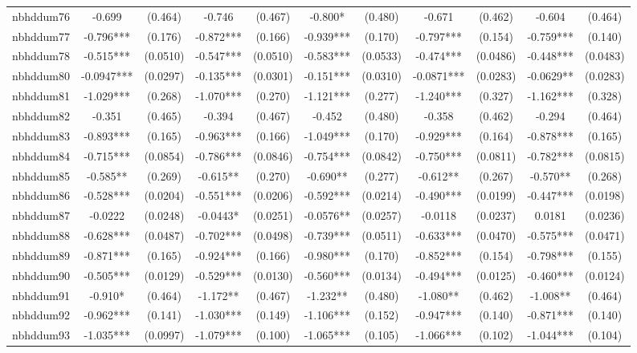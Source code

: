 \documentclass[]{article}
\begin{document}
\begin{tabular}{lcccccccccc}
nbhddum76 & -0.699 & (0.464) & -0.746 & (0.467) & -0.800* & (0.480) & -0.671 & (0.462) & -0.604 & (0.464) \\
nbhddum77 & -0.796*** & (0.176) & -0.872*** & (0.166) & -0.939*** & (0.170) & -0.797*** & (0.154) & -0.759*** & (0.140) \\
nbhddum78 & -0.515*** & (0.0510) & -0.547*** & (0.0510) & -0.583*** & (0.0533) & -0.474*** & (0.0486) & -0.448*** & (0.0483) \\
nbhddum80 & -0.0947*** & (0.0297) & -0.135*** & (0.0301) & -0.151*** & (0.0310) & -0.0871*** & (0.0283) & -0.0629** & (0.0283) \\
nbhddum81 & -1.029*** & (0.268) & -1.070*** & (0.270) & -1.121*** & (0.277) & -1.240*** & (0.327) & -1.162*** & (0.328) \\
nbhddum82 & -0.351 & (0.465) & -0.394 & (0.467) & -0.452 & (0.480) & -0.358 & (0.462) & -0.294 & (0.464) \\
nbhddum83 & -0.893*** & (0.165) & -0.963*** & (0.166) & -1.049*** & (0.170) & -0.929*** & (0.164) & -0.878*** & (0.165) \\
nbhddum84 & -0.715*** & (0.0854) & -0.786*** & (0.0846) & -0.754*** & (0.0842) & -0.750*** & (0.0811) & -0.782*** & (0.0815) \\
nbhddum85 & -0.585** & (0.269) & -0.615** & (0.270) & -0.690** & (0.277) & -0.612** & (0.267) & -0.570** & (0.268) \\
nbhddum86 & -0.528*** & (0.0204) & -0.551*** & (0.0206) & -0.592*** & (0.0214) & -0.490*** & (0.0199) & -0.447*** & (0.0198) \\
nbhddum87 & -0.0222 & (0.0248) & -0.0443* & (0.0251) & -0.0576** & (0.0257) & -0.0118 & (0.0237) & 0.0181 & (0.0236) \\
nbhddum88 & -0.628*** & (0.0487) & -0.702*** & (0.0498) & -0.739*** & (0.0511) & -0.633*** & (0.0470) & -0.575*** & (0.0471) \\
nbhddum89 & -0.871*** & (0.165) & -0.924*** & (0.166) & -0.980*** & (0.170) & -0.852*** & (0.154) & -0.798*** & (0.155) \\
nbhddum90 & -0.505*** & (0.0129) & -0.529*** & (0.0130) & -0.560*** & (0.0134) & -0.494*** & (0.0125) & -0.460*** & (0.0124) \\
nbhddum91 & -0.910* & (0.464) & -1.172** & (0.467) & -1.232** & (0.480) & -1.080** & (0.462) & -1.008** & (0.464) \\
nbhddum92 & -0.962*** & (0.141) & -1.030*** & (0.149) & -1.106*** & (0.152) & -0.947*** & (0.140) & -0.871*** & (0.140) \\
nbhddum93 & -1.035*** & (0.0997) & -1.079*** & (0.100) & -1.065*** & (0.105) & -1.066*** & (0.102) & -1.044*** & (0.104) \\

\end{tabular}
\end{document}
